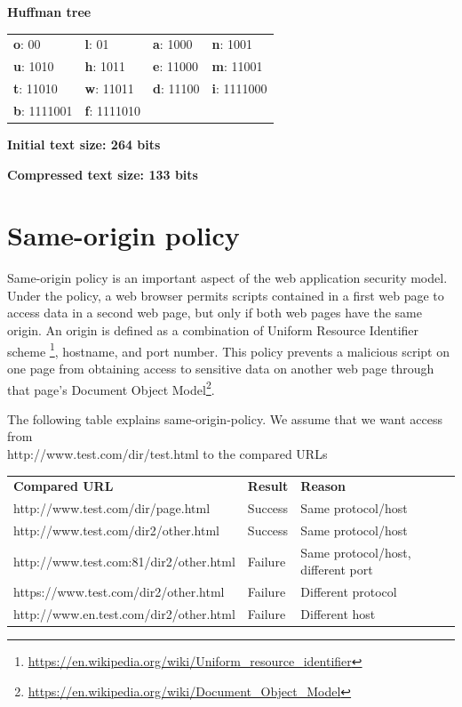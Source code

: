 \centerline{\textbf{Huffman tree}}

\begin{table}[H] \centering \begin{tabular}{ | l | l | l | l | } \hline
\textbf{o}: 00 & \textbf{l}: 01 & \textbf{a}: 1000 & \textbf{n}: 1001 \\
\textbf{u}: 1010 & \textbf{h}: 1011 & \textbf{e}: 11000 & \textbf{m}: 11001 \\
\textbf{t}: 11010 & \textbf{w}: 11011 & \textbf{d}: 11100 & \textbf{i}: 1111000
\\ \textbf{b}: 1111001 & \textbf{f}: 1111010 & \textbf{}  & \textbf{}
\\ \hline \end{tabular} \end{table}

\centerline{\textbf{Initial text size: 264 bits}} \centerline{\textbf{Compressed
text size: 133 bits}}


\section{Same-origin policy}\label{sec:sameorigin}

Same-origin policy is an important aspect of the web application security model. 
Under the policy, a web browser permits scripts contained in a first web page 
to access data in a second web page, but only if both web pages have the same 
origin. An origin is defined as a combination of Uniform Resource Identifier scheme
\footnote{\url{https://en.wikipedia.org/wiki/Uniform_resource_identifier}}, hostname,
and port number. This policy prevents a malicious script on one page from obtaining
access to sensitive  data on another web page through that page's Document Object
Model\footnote{\url{https://en.wikipedia.org/wiki/Document_Object_Model}}.

The following table explains same-origin-policy. We assume that we want access from \\
http://www.test.com/dir/test.html to the compared URLs


\begin{table}[H] \centering \begin{tabular}{ | l | l | l | } \hline
\textbf{Compared URL} & \textbf{Result} & \textbf{Reason}   \\
http://www.test.com/dir/page.html & Success & Same protocol/host \\
http://www.test.com/dir2/other.html & Success & Same protocol/host \\
http://www.test.com:81/dir2/other.html & Failure & Same protocol/host, different port \\
https://www.test.com/dir2/other.html & Failure & Different protocol \\
http://www.en.test.com/dir2/other.html & Failure & Different host \\
\hline \end{tabular} \end{table}


